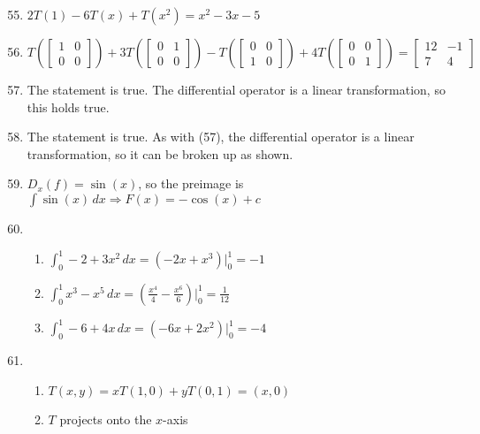 \documentclass[12pt]{article}
\begin{document}
\begin{enumerate}
    \setcounter{enumi}{54}

  \item $2T(1)-6T(x)+T(x^2)=x^2-3x-5$

  \item $T\left( \begin{bmatrix} 1 & 0\\ 0 & 0\end{bmatrix} \right)+3T\left( \begin{bmatrix} 0 & 1\\ 0 & 0  \end{bmatrix} \right)-T\left( \begin{bmatrix} 0 & 0\\ 1 & 0\end{bmatrix} \right)+4T\left( \begin{bmatrix} 0 & 0\\ 0 & 1\end{bmatrix} \right)=\begin{bmatrix} 12 & -1\\ 7 & 4 \end{bmatrix}$

  \item The statement is true. The differential operator is a linear transformation, so this holds true.

  \item The statement is true. As with (57), the differential operator is a linear transformation, so it can be broken up as shown.

    \setcounter{enumi}{62}

  \item $D_x(f)=\sin(x)$, so the preimage is $\int\sin(x)\,dx\Rightarrow F(x)=-\cos(x)+c$

    \setcounter{enumi}{64}

  \item

    \begin{enumerate}

      \item $\int_0^1 -2+3x^2\,dx=\left( -2x+x^3 \right)\Big|_0^1=-1$ 

      \item $\int_0^1 x^3-x^5\,dx=\left( \frac{x^4}{4}-\frac{x^6}{6} \right)\Big|_0^1=\frac{1}{12}$

      \item $\int_0^1 -6+4x\,dx=\left( -6x+2x^2 \right)\Big|_0^1=-4$

    \end{enumerate}

    \setcounter{enumi}{68}

  \item

    \begin{enumerate}

      \item $T(x,y)=xT(1,0)+yT(0,1)=(x,0)$

      \item $T$ projects onto the $x$-axis

    \end{enumerate}

\end{enumerate}
\end{document}
